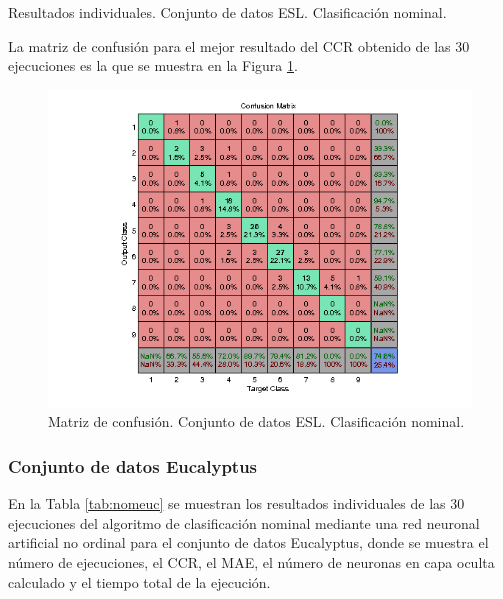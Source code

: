 			\begin{table}[!htbp]
				\centering
				\caption{Resultados individuales. Conjunto de datos ESL. Clasificación nominal.}
				\label{tab:nomesl}
			\end{table}
			
			La matriz de confusión para el mejor resultado del CCR obtenido de las 30 ejecuciones es la que se muestra en la Figura \ref{fig:nomesl}.
			
			\begin{figure}[htbp]
				\centering
				\includegraphics[scale=0.8]{../src/results/nominal/ESL_mc12.png}
				\caption{Matriz de confusión. Conjunto de datos ESL. Clasificación nominal.}
				\label{fig:nomesl}
			\end{figure}

			\subsubsection{Conjunto de datos Eucalyptus}
			
			En la Tabla \ref{tab:nomeuc} se muestran los resultados individuales de las 30 ejecuciones del algoritmo de clasificación nominal mediante una red neuronal artificial no ordinal para el conjunto de datos Eucalyptus, donde se muestra el número de ejecuciones, el CCR, el MAE, el número de neuronas en capa oculta calculado y el tiempo total de la ejecución.\\
			
